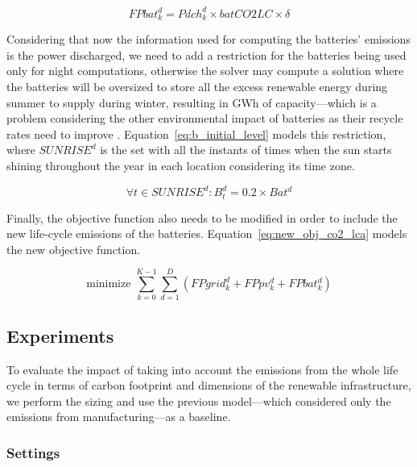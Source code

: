 \begin{equation} \label{eq:fbat_lca}
   FPbat^d_k =  Pdch^d_k \times batCO2LC \times \delta
 \end{equation}


 Considering that now the information used for computing the batteries' emissions is the power discharged, we need to add a restriction for the batteries being used only for night computations, otherwise the solver may compute a solution where the batteries will be oversized to store all the excess renewable energy during summer to supply during winter, resulting in GWh of capacity---which is a problem considering the other environmental impact of batteries as their recycle rates need to improve \cite{batteries_baumman}. Equation~\eqref{eq:b_initial_level}  models this restriction, where $SUNRISE^d$ is the set with all the instants of times when the sun starts shining throughout the year in each location considering its time zone.
 
\begin{equation} \label{eq:b_initial_level}
  \forall t \in SUNRISE^d :  B^d_t =  0.2 \times Bat^d
\end{equation}

Finally, the objective function also needs to be modified in order to include the new life-cycle emissions of the batteries. Equation~\ref{eq:new_obj_co2_lca} models the new objective function.

\begin{equation} \label{eq:new_obj_co2_lca}
  \text{minimize }\sum_{k=0}^{K-1} \sum_{d=1}^D (FPgrid^d_k +  FPpv^d_k  + FPbat^d_k) 
\end{equation}



\subsection{Experiments}

To evaluate the impact of taking into account the emissions from the whole life cycle in terms of carbon footprint and dimensions of the renewable infrastructure, we perform the sizing and use the previous model---which considered only the emissions from manufacturing---as a baseline. 



\label{sec:ex_lca_pv}

\subsubsection{Settings} 

